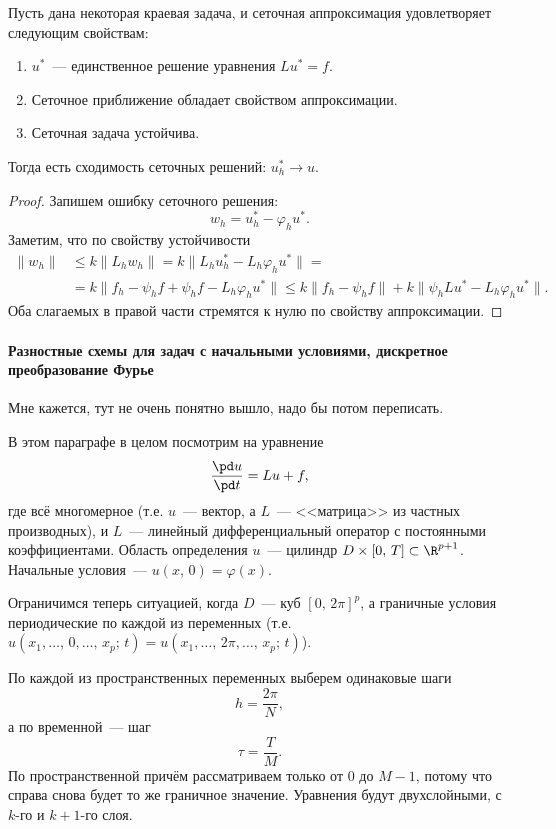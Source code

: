 \documentclass{trlnotes}
\begin{document}
\begin{thm}
	Пусть дана некоторая краевая задача, и сеточная аппроксимация удовлетворяет следующим свойствам:
	\begin{enumerate}
		\item $u^*$~--- единственное решение уравнения $Lu^* = f$.
		\item Сеточное приближение обладает свойством аппроксимации.
		\item Сеточная задача устойчива.
	\end{enumerate}
	Тогда есть сходимость сеточных решений: $u^*_h \to u$.
	\begin{proof}
		Запишем ошибку сеточного решения:
		\[
			w_h = u_h^* - \varphi_h u^*.
		\]
		Заметим, что по свойству устойчивости
		\begin{align*}
			\|w_h\| &\leqslant k \|L_h w_h\| = k\|L_h u_h^* - L_h \varphi_h u^*\| = \\ &= k\|f_h - \psi_h f + \psi_h f - L_h \varphi_h u^*\| \leqslant k\|f_h - \psi_h f\| + k\|\psi_h L u^* - L_h \varphi_h u^*\|.
		\end{align*}
		Оба слагаемых в правой части стремятся к нулю по свойству аппроксимации.
	\end{proof}
\end{thm}

\paragraph{Разностные схемы для задач с начальными условиями, дискретное преобразование Фурье}

\begin{rem}
	Мне кажется, тут не очень понятно вышло, надо бы потом переписать. 
\end{rem}

В этом параграфе в целом посмотрим на уравнение 
\[
	\dfrac{\pd u}{\pd t} = Lu + f,
\]
где всё многомерное (т.е. $u$~--- вектор, а $L$~--- <<матрица>> из частных производных), и $L$~--- линейный дифференциальный оператор с постоянными коэффициентами. Область определения $u$~--- цилиндр $D\times [0, \, T] \subset \R^{p + 1}$. Начальные условия~--- $u(x, \, 0) = \varphi(x)$.

Ограничимся теперь ситуацией, когда $D$~--- куб $[0, \, 2\pi]^p$, а граничные условия периодические по каждой из переменных (т.е. $u(x_1, \ldots, \, 0, \ldots, \, x_p; \, t) = u(x_1, \ldots, \, 2\pi, \ldots, \, x_p; \, t)$). 

По каждой из пространственных переменных выберем одинаковые шаги
\[
	h = \dfrac{2\pi}{N},
\] 
а по временной~--- шаг
\[
	\tau = \dfrac{T}{M}.
\]
По пространственной причём рассматриваем только от $0$ до $M-1$, потому что справа снова будет то же граничное значение. Уравнения будут двухслойными, с $k$-го и $k+1$-го слоя.
\end{document}
